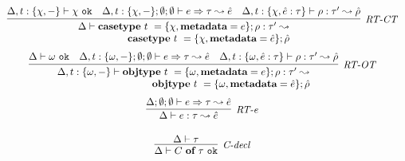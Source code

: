 


\begin{figure}
\centering
\[
\begin{array}{c}
\infer[\textit{RT-CT}]
          {\renewcommand{\arraystretch}{1}
	    \begin{array}{r}
	    \Delta \vdash  \keyw{casetype}~ t~=\{\chi, \keyw{metadata}=e\}; \rho :\tau' \leadsto \\
            \keyw{casetype}~ t~=\{\chi, \keyw{metadata}=\hat{e}\};\hat{\rho}
            \end{array}
       }
	  {\Delta, t:\{\chi,-\} \vdash \chi~\texttt{ok} & \Delta, t:\{\chi,-\}; \emptyset; \emptyset \vdash e \Rightarrow \tau \leadsto \hat{e} & \Delta, t:\{\chi, \hat e:\tau\} \vdash \rho :\tau'\leadsto \hat{\rho} }
	   \\[3ex] 

\infer[\textit{RT-OT}]
          {\renewcommand{\arraystretch}{1}
	    \begin{array}{r}
	    \Delta, t:\{\omega,-\}\vdash  \keyw{objtype}~ t~=\{{\omega}, \keyw{metadata}=e\}; \rho: \tau'\leadsto\\
            \keyw{objtype}~ t~=\{{\omega}, \keyw{metadata}=\hat{e}\}; \hat{\rho}
            \end{array}
       }
	  {\Delta \vdash \omega~\texttt{ok} & \Delta, t:\{\omega,-\}; \emptyset; \emptyset \vdash e \Rightarrow \tau \leadsto \hat{e} & \Delta, t:\{\omega, \hat e:\tau\} \vdash \rho :\tau'\leadsto \hat{\rho} }
	   \\[3ex] 

\infer[\textit{RT-e}]
	{\Delta \vdash  e:\tau \leadsto \hat{e}} 
	{\Delta; \emptyset; \emptyset \vdash e \Rightarrow \tau \leadsto \hat{e}}\\[3ex]

\infer[\textit{C-decl}]
	{\Delta \vdash  C~\keyw{of}~\tau~\texttt{ok}} 
	{\Delta \vdash \tau   }\\[3ex]


\end{array}\]
\end{figure}
